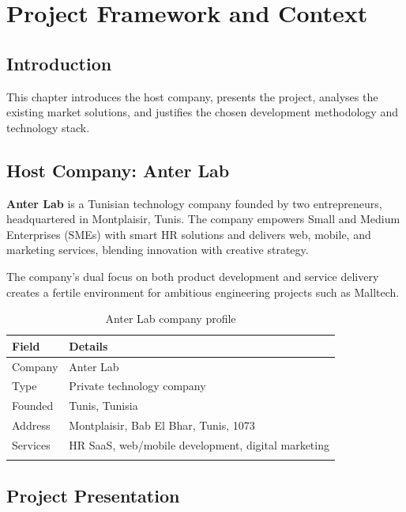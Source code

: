 
\chapter{Project Framework and Context}

\section*{Introduction}
This chapter introduces the host company, presents the project, analyses the
existing market solutions, and justifies the chosen development methodology and
technology stack.

\section{Host Company: Anter Lab}

\textbf{Anter Lab} is a Tunisian technology company founded by two entrepreneurs,
headquartered in Montplaisir, Tunis. The company empowers Small and Medium Enterprises
(SMEs) with smart HR solutions and delivers web, mobile, and marketing services,
blending innovation with creative strategy.

The company's dual focus on both product development and service delivery creates a
fertile environment for ambitious engineering projects such as Malltech.

\begin{longtable}{|m{3.5cm}|m{10cm}|}
    \hline
    \textbf{Field} & \textbf{Details}                                   \\
    \hline
    \endhead
    \endfoot
    \endlastfoot
    \hline
    Company        & Anter Lab                                          \\
    \hline
    Type           & Private technology company                         \\
    \hline
    Founded        & Tunis, Tunisia                                     \\
    \hline
    Address        & Montplaisir, Bab El Bhar, Tunis, 1073              \\
    \hline
    Services       & HR SaaS, web/mobile development, digital marketing \\
    \hline
    \caption{Anter Lab company profile}
    \label{tab:company_profile}
\end{longtable}

\section{Project Presentation}

